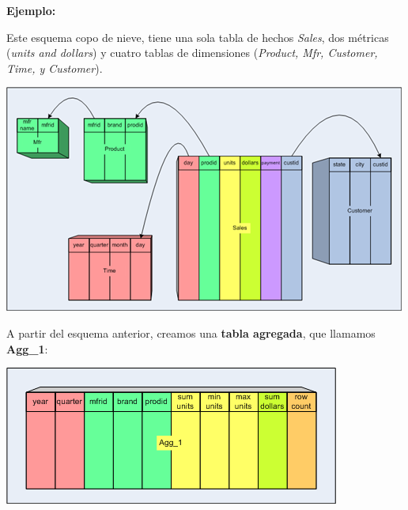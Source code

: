 \documentclass{fancyslides}
\begin{document}
\begin{frame}
\misc
{
\textbf{Ejemplo:}

Este esquema copo de nieve, tiene una sola tabla de hechos \textit{Sales}, dos métricas (\textit{units and dollars}) y cuatro tablas de dimensiones (\textit{Product, Mfr, Customer, Time, y Customer}).

\begin{center}
\includegraphics[scale=0.4]{aggregate_tables_1}
\end{center}
}
\end{frame}

\begin{frame}
\misc
{
A partir del esquema anterior, creamos una \textbf{tabla agregada}, que llamamos \textbf{Agg\_1}:
 
\begin{center}
\includegraphics[scale=0.5]{aggregate_tables_2}
\end{center}
}
\end{frame}
\end{document}
